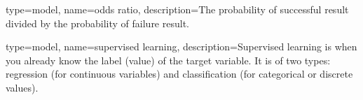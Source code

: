 

{
	type=model,
    name=odds ratio,
    description={The probability of successful result divided by the probability of failure result.}
}

{
	type=model,
    name=supervised learning,
    description={Supervised learning is when you already know the label (value) of the target variable. It is of two types: regression (for continuous variables) and classification (for categorical or discrete values).}
}
